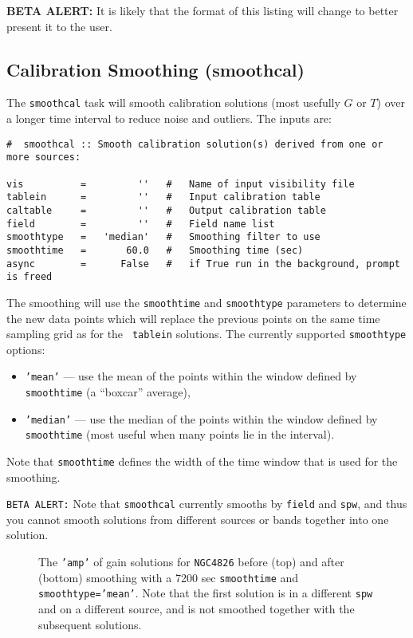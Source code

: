 {\bf BETA ALERT:} It is likely that the format of this listing will change
to better present it to the user.

\subsection{Calibration Smoothing ({\rm smoothcal})}
\label{section:cal.tables.smooth}

The {\tt smoothcal} task will smooth calibration solutions 
(most usefully $G$ or $T$) over a longer time interval to reduce noise
and outliers.  The inputs are:
\small
\begin{verbatim}
#  smoothcal :: Smooth calibration solution(s) derived from one or more sources:

vis          =         ''   #   Name of input visibility file
tablein      =         ''   #   Input calibration table
caltable     =         ''   #   Output calibration table
field        =         ''   #   Field name list
smoothtype   =   'median'   #   Smoothing filter to use
smoothtime   =       60.0   #   Smoothing time (sec)
async        =      False   #   if True run in the background, prompt is freed
\end{verbatim}
\normalsize

The smoothing will use the {\tt smoothtime} and {\tt smoothtype}
parameters to determine the new data points which will replace the
previous points on the same time sampling grid as for the {\tt
tablein} solutions.  The currently supported {\tt smoothtype} 
options: 
\begin{itemize}
\item {\tt 'mean'} --- use the mean of the points within the window
defined by {\tt smoothtime} (a ``boxcar'' average),

\item {\tt 'median'} --- use the median of the points within the window
defined by {\tt smoothtime} (most useful when many points lie in the
interval).
\end{itemize}
Note that {\tt smoothtime} defines the width of the time window that
is used for the smoothing.

{\tt BETA ALERT:} Note that {\tt smoothcal} currently smooths by
{\tt field} and {\tt spw}, and thus you cannot smooth solutions
from different sources or bands together into one solution.

\begin{figure}[h!]
\begin{center}
\caption{\label{fig:smoothcal_4826} The {\tt 'amp'} of gain solutions
for {\tt NGC4826} before (top) and after (bottom) smoothing with
a 7200 sec {\tt smoothtime} and {\tt smoothtype='mean'}.  Note that
the first solution is in a different {\tt spw} and on a different
source, and is not smoothed together with the subsequent solutions.}
\hrulefill
\end{center}
\end{figure}

